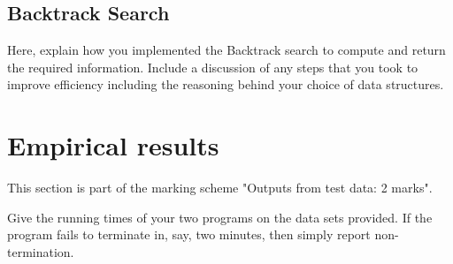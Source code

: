 \documentclass{article}
\begin{document}
\subsection*{Backtrack Search}

Here, explain how you implemented the Backtrack search to compute and return the required information. Include a discussion of any steps that you took to improve efficiency including the reasoning behind your choice of data structures.

\section*{Empirical results}

This section is part of the marking scheme "Outputs from test data: 2 marks".

Give the running times of your two programs on the data sets provided. If the program fails to terminate in, say, two minutes, then simply report non-termination. 
\end{document}
